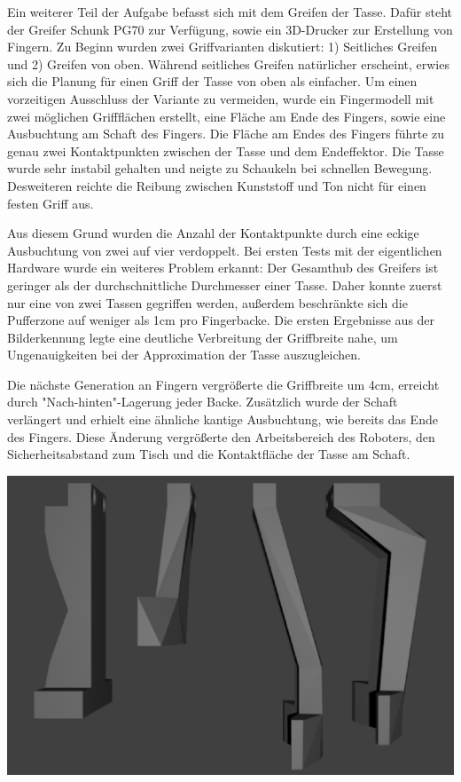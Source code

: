 Ein weiterer Teil der Aufgabe befasst sich mit dem Greifen der Tasse. Dafür steht der Greifer Schunk PG70 zur Verfügung, sowie ein 3D-Drucker zur Erstellung von Fingern. Zu Beginn wurden zwei Griffvarianten diskutiert: 1) Seitliches Greifen und 2) Greifen von oben. Während seitliches Greifen natürlicher erscheint, erwies sich die Planung für einen Griff der Tasse von oben als einfacher. Um einen vorzeitigen Ausschluss der Variante zu vermeiden, wurde ein Fingermodell mit zwei möglichen Griffflächen erstellt, eine Fläche am Ende des Fingers, sowie eine Ausbuchtung am Schaft des Fingers. Die Fläche am Endes des Fingers führte zu genau zwei Kontaktpunkten zwischen der Tasse und dem Endeffektor. Die Tasse wurde sehr instabil gehalten und neigte zu Schaukeln bei schnellen Bewegung. Desweiteren reichte die Reibung zwischen Kunststoff und Ton nicht für einen festen Griff aus.

Aus diesem Grund wurden die Anzahl der Kontaktpunkte durch eine eckige Ausbuchtung von zwei auf vier verdoppelt. Bei ersten Tests mit der eigentlichen Hardware wurde ein weiteres Problem erkannt: Der Gesamthub des Greifers ist geringer als der durchschnittliche Durchmesser einer Tasse. Daher konnte zuerst nur eine von zwei Tassen gegriffen werden, außerdem beschränkte sich die Pufferzone auf weniger als 1cm pro Fingerbacke. Die ersten Ergebnisse aus der Bilderkennung legte eine deutliche Verbreitung der Griffbreite nahe, um Ungenauigkeiten bei der Approximation der Tasse auszugleichen.

Die nächste Generation an Fingern vergrößerte die Griffbreite um 4cm, erreicht durch "Nach-hinten"-Lagerung jeder Backe. Zusätzlich wurde der Schaft verlängert und erhielt eine ähnliche kantige Ausbuchtung, wie bereits das Ende des Fingers. Diese Änderung vergrößerte den Arbeitsbereich des Roboters, den Sicherheitsabstand zum Tisch und die Kontaktfläche der Tasse am Schaft.

\includegraphics[width=\textwidth]{images/finger_evolution.png}

